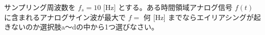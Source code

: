 サンプリング周波数を $f_s = 10$ [Hz] とする。ある時間領域アナログ信号 $f(t)$ に含まれるアナログサイン波が最大で $f=$ 何 [Hz] までならエイリアシングが起きないのか選択肢a〜dの中から1つ選びなさい。
